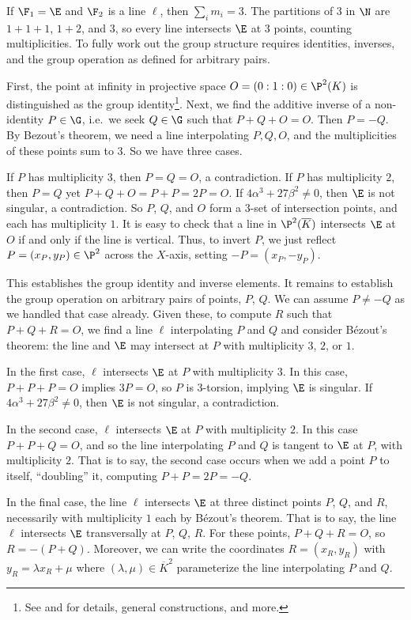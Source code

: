 \documentclass[11pt,letterpaper]{article}
\theoremstyle{definition}
\newcommand{\6}{\mathbf}
\newcommand{\7}{\mathcal}
\begin{document}
If $\F_1 = \E$ and $\F_2$ is a line $\ell$, then $\sum_i m_i = 3$. The partitions of $3$ in $\N$ are $1 + 1 + 1$, $1 + 2$, and $3$, so every line intersects $\E$ at $3$ points, counting multiplicities. To fully work out the group structure requires identities, inverses, and the group operation as defined for arbitrary pairs.


First, the point at infinity in projective space $O=(0:1:0) \in \P^2(K)$ is distinguished as the group identity\footnote{See \cite{Silverman} and \cite{Hartshorne} for details, general constructions, and more.}. Next, we find the additive inverse of a non-identity $P \in \G$, i.e.\ we seek $Q \in \G$ such that $P + Q + O = O$. Then  $P = -Q$. By Bezout's theorem, we need a line interpolating $P, Q, O$, and the multiplicities of these points sum to $3$. So we have three cases.

If $P$ has multiplicity $3$, then $P = Q = O$, a contradiction. If $P$ has multiplicity $2$, then $P = Q$ yet $P + Q + O = P + P = 2P = O$.  If $4\alpha^3 + 27\beta^2 \neq 0$, then $\E$ is not singular, a contradiction. So $P$, $Q$, and $O$ form a $3$-set of intersection points, and each has multiplicity $1$. It is easy to check that a  line in $\P^2(\overline{K})$ intersects $\E$ at $O$ if and only if the line is vertical. Thus, to invert $P$, we just reflect $P=(x_P,y_P) \in \P^2$ across the $X$-axis, setting $-P = (x_P, -y_P)$.

This establishes the group identity and inverse elements. It remains to establish the group operation on arbitrary pairs of points, $P$, $Q$. We can assume $P \neq -Q$ as we handled that case already. Given these, to compute $R$ such that $P + Q + R = O$, we find a line $\ell$ interpolating $P$ and $Q$ and consider B\'{e}zout's theorem: the line and $\E$ may intersect at $P$ with multiplicity $3$, $2$, or $1$.

In the first case, $\ell$ intersects $\E$ at $P$ with multiplicity $3$. In this case, $P + P + P = O$ implies $3P = O$, so $P$ is $3$-torsion, implying $\E$ is singular. If $4\alpha^3 + 27\beta^2 \neq 0$, then $\E$ is not singular, a contradiction. 

In the second case, $\ell$ intersects $\E$ at $P$ with multiplicity $2$. In this case $P + P + Q = O$, and so the line interpolating $P$ and $Q$ is tangent to $\E$ at $P$, with multiplicity $2$. That is to say, the second case occurs when we add a point $P$ to itself, ``doubling'' it, computing $P + P = 2P = -Q$. 

In the final case, the line $\ell$ intersects $\E$ at three distinct points $P$, $Q$, and $R$, necessarily with multiplicity $1$ each by B\'{e}zout's theorem. That is to say, the line $\ell$ intersects $\E$ transversally at $P$, $Q$, $R$. For these points, $P + Q + R = O$, so $R = -(P+Q)$. Moreover, we can write the coordinates $R=(x_R, y_R)$ with $y_R = \lambda x_R + \mu$ where $(\lambda, \mu) \in \overline{K}^2$ parameterize the line interpolating $P$ and $Q$.
\end{document}
